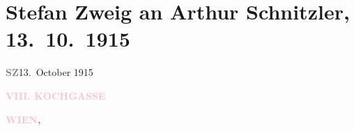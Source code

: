 

\renewcommand{\erwaehntePersonen}{Personen: Albert Bassermann, Otto Brahm, Olga Schnitzler, Harry Walden, Berta Zuckerkandl, Stefan Zweig}
\renewcommand{\erwaehnteInstitutionen}{Institutionen: Burgtheater, Lessing-Theater}
\renewcommand{\erwaehnteOrte}{Orte: Berlin, Burgtheater, Kochgasse 8, Wien}
\renewcommand{\erwaehnteWerke}{Werke: Das Bacchusfest, Große Szene, Komödie der Worte. Drei Einakter, Stunde des Erkennens}
\section[Stefan Zweig an Arthur Schnitzler, 13. 10. 1915]{Stefan Zweig an Arthur Schnitzler, 13. 10. 1915}
\nopagebreak{}
\rehead{ }\normalsize\beginnumbering{}
\toendnotes[C]{\smallbreak\pagebreak[2]}
\toendnotes[C]{\smallbreak}
\pstart
           {\pb}\textcolor{gray}{\textbf{SZ}}\hfill 13. October 1915\pend
           
\pstart
           \raggedleft{}\textcolor{gray}{\textbf{\textcolor{pink}{VIII. KOCHGASSE}{}\ledrightnote{\textcolor{pink}{Kochgasse 8}}}}\pend
           
\pstart
           \raggedleft{}\textcolor{gray}{\textbf{\textcolor{pink}{WIEN}{}\ledrightnote{\textcolor{pink}{Wien}},}}\pend
           
